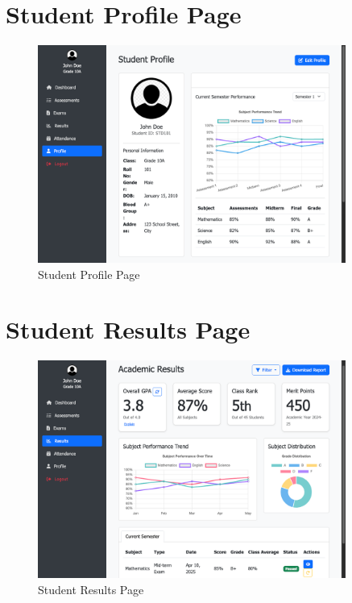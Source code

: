 \documentclass[12pt,a4paper]{report}
\begin{document}
\section{Student Profile Page}
\begin{figure}[htbp]
    \centering
    \includegraphics[width=0.9\textwidth]{student-profile-page.png}
    \caption{Student Profile Page}
    \label{fig:student-profile-page}
\end{figure}

\section{Student Results Page}
\begin{figure}[htbp]
    \centering
    \includegraphics[width=0.9\textwidth]{student-results-page.png}
    \caption{Student Results Page}
    \label{fig:student-results-page}
\end{figure}
\end{document}
